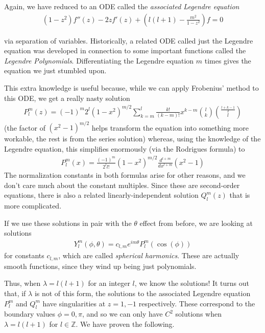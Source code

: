 \documentclass{article}
\newcommand{\Z}{{\mathbb{Z}}}
\begin{document}
	Again, we have reduced to an ODE called the \textit{associated Legendre equation}
	\begin{align*}
		(1-z^{2})f''(z) - 2zf'(z) + \left(l(l+1) - \frac{m^{2}}{1-z^{2}}\right)f=0
	\end{align*}
	
	via separation of variables. Historically, a related ODE called just the Legendre equation was developed in connection to some important functions called the \textit{Legendre Polynomials}. Differentiating the Legendre equation $m$ times gives the equation we just stumbled upon. 
	
	This extra knowledge is useful because, while we can apply Frobenius' method to this ODE, we get a really nasty solution 
	\begin{align*}
		P_{l}^{m}(z) = (-1)^{m}2^{l}(1-x^2)^{m/2} \sum_{k=m}^{l} \frac{k!}{(k-m)!} x^{k-m} \binom{l}{k}\binom{\frac{l+k-1}{2}}{l}
	\end{align*}
	(the factor of $(x^{2}-1)^{m/2}$ helps transform the equation into something more workable, the rest is from the series solution)
	whereas, using the knowledge of the Legendre equation, this simplifies enormously (via the Rodrigues formula) to 
	\begin{align*}
		P_{l}^{m}(x) = \frac{(-1)^{m}}{2^{l}l!}(1-x^2)^{m/2} \frac{d^{l+m}}{dx^{l+m}}(x^{2}-1)
	\end{align*}
	The normalization constants in both formulas arise for other reasons, and we don't care much about the constant multiples. Since these are second-order equations, there is also a related linearly-independent solution $Q^{m}_{l}(z)$ that is more complicated. 
	
	If we use these solutions in pair with the $\theta$ effect from before, we are looking at solutions 
	\begin{align*}
		Y^{m}_{l}(\phi,\theta) = c_{l,m} e^{im\theta} P_{l}^{m}(\cos(\phi))
	\end{align*}
	for constants $c_{l,m}$, which are called \textit{spherical harmonics}. These are actually smooth functions, since they wind up being just polynomials. 
	
	Thus, when $\lambda = l(l+1)$ for an integer $l$, we know the solutions! It turns out that, if $\lambda$ is not of this form, the solutions to the associated Legendre equation $P_{l}^{m}$ and $Q_{l}^{m}$ have singularities at $z=1,-1$ respectively. These correspond to the boundary values $\phi = 0,\pi$, and so we can only have $C^{2}$ solutions when $\lambda = l(l+1)$ for $l \in \Z$. We have proven the following. 
	
\end{document}
